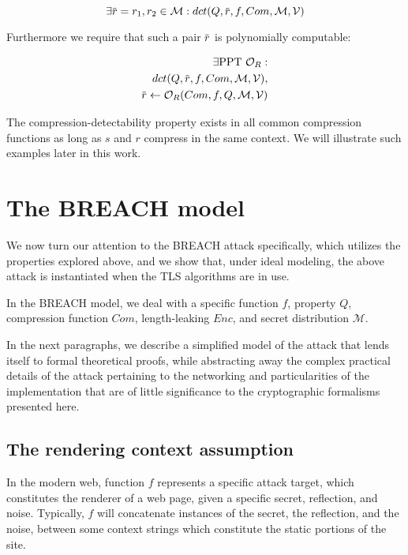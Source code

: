 \documentclass{sig-alternate-05-2015}
\newcommand{\overbar}[1]{\mkern 1.5mu\overline{\mkern-1.5mu#1\mkern-1.5mu}\mkern 1.5mu}
\begin{document}
\begin{equation*}
    \exists \overbar{r} = r_1, r_2 \in \mathcal{M}:
    dct(Q, \overbar{r}, f, Com, \mathcal{M}, \mathcal{V})
\end{equation*}

Furthermore we require that such a pair $\overbar{r}$ is polynomially
computable:

\begin{align*}
    \exists \text{PPT } \mathcal{O}_R:\\
    dct(Q, \overbar{r}, f, Com, \mathcal{M}, \mathcal{V}),\\
    \overbar{r} \leftarrow \mathcal{O}_R(Com, f, Q, \mathcal{M}, \mathcal{V})
\end{align*}

The compression-detectability property exists in all common compression
functions as long as $s$ and $r$ compress in the same context. We will
illustrate such examples later in this work.

\section{The BREACH model}\label{sec:breachmodel}
We now turn our attention to the BREACH attack specifically, which utilizes
the properties explored above, and we show that, under ideal modeling,
the above attack is instantiated when the TLS algorithms are in use.

In the BREACH model, we deal with a specific function $f$, property $Q$,
compression function $Com$, length-leaking $Enc$, and secret distribution
$\mathcal{M}$.

In the next paragraphs, we describe a simplified model of the attack that
lends itself to formal theoretical proofs, while abstracting away the complex
practical details of the attack pertaining to the networking and particularities
of the implementation that are of little significance to the cryptographic
formalisms presented here.

\subsection{The rendering context assumption}\label{subsec:rendering}

In the modern web, function $f$ represents a specific attack target, which
constitutes the renderer of a web page, given a specific secret, reflection,
and noise. Typically, $f$ will concatenate instances of the secret, the
reflection, and the noise, between some context strings which constitute the
static portions of the site.
\end{document}
